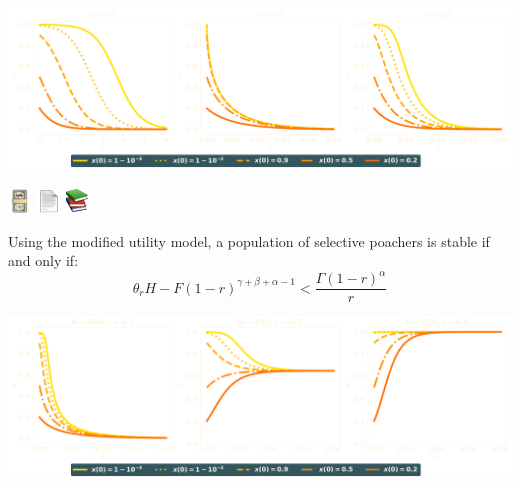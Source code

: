 \documentclass{beamer}
\begin{document}
\begin{frame}
    \centering
    \includegraphics[width=\textwidth]{static/numeric_one.pdf}
\end{frame}

\begin{frame}
    \centering
    \includegraphics[width=.15\textwidth]{static/1F4B5c.pdf} \hspace{1cm}
    \includegraphics[width=.15\textwidth]{static/1F4C4.pdf} \hspace{1cm}
    \includegraphics[width=.15\textwidth]{static/1F4DA.pdf}
\end{frame}

\begin{frame}
    \centering
    \footnotesize
    \begin{theorem}[Disincentive]
    Using the modified utility model, a population of selective poachers is stable
    if and only if:
     \[\theta_r H - F (1 - r)^{\gamma + \beta + \alpha -1} < \frac{\Gamma(1 - r)^{\alpha}}{r}\]
    \end{theorem}

    \pause
    \vspace{1cm}
    \centering
    \includegraphics[width=\textwidth]{static/numeric_two.pdf}
\end{frame}
\end{document}
